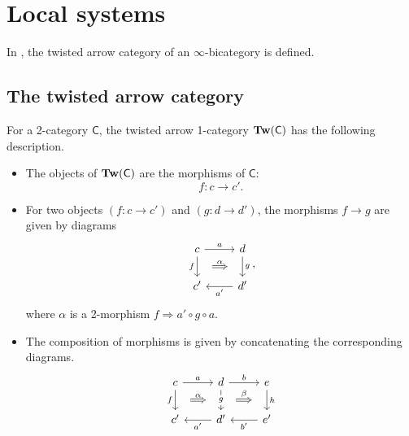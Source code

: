 \documentclass[main.tex]{subfiles}
\begin{document}
\section{Local systems}
\label{sec:local_systems}

In \cite{garcia2020enhanced}, the twisted arrow category of an $\infty$-bicategory is defined.

\subsection{The twisted arrow category}
\label{ssc:the_twisted_arrow_category}

For a 2-category $\mathsf{C}$, the twisted arrow 1-category $\mathbf{Tw}(\mathsf{C})$ has the following description.
\begin{itemize}
  \item The objects of $\mathbf{Tw}(\mathsf{C})$ are the morphisms of $\mathsf{C}$:
    \begin{equation*}
      f\colon c \to c'.
    \end{equation*}

  \item For two objects $(f\colon c \to c')$ and $(g\colon d \to d')$, the morphisms $f \to g$ are given by diagrams
    \begin{equation*}
      \begin{tikzcd}
        c
        \arrow[r, "a"]
        \arrow[d, "f"{swap}, ""{name=L}]
        & d
        \arrow[d, "g", ""{name=R, swap}]
        \\
        c'
        & d'
        \arrow[l, "a'"]
        \arrow[from=L, to=R, Rightarrow, shorten=2ex, "\alpha"]
      \end{tikzcd},
    \end{equation*}
    where $\alpha$ is a 2-morphism $f \Rightarrow a' \circ g \circ a$.


  \item The composition of morphisms is given by concatenating the corresponding diagrams.
    \begin{equation*}
      \begin{tikzcd}
        c
        \arrow[r, "a"]
        \arrow[d, "f"{swap}, ""{name=L}]
        & d
        \arrow[d, "g"{description}, ""{name=LM}, ""{name=RM, swap}]
        \arrow[r, "b"]
        & e
        \arrow[d, "h", ""{name=R, swap}]
        \\
        c'
        & d'
        \arrow[l, "a'"]
        & e'
        \arrow[l, "b'"]
        \arrow[from=L, to=RM, Rightarrow, shorten=2ex, "\alpha"]
        \arrow[from=LM, to=R, Rightarrow, shorten=2ex, "\beta"]
      \end{tikzcd}
    \end{equation*}
\end{itemize}
\end{document}
